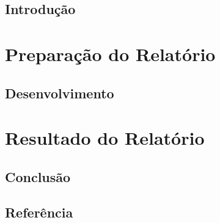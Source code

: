 \documentclass[12pt,a4paper,oneside]{memoir}
\begin{document}
\chapter*{Introdução}

\part{Preparação do Relatório}
\chapter{Desenvolvimento}
\part{Resultado do Relatório}
\chapter{Conclusão}


%
%

\chapter*{Referência}
\end{document}
